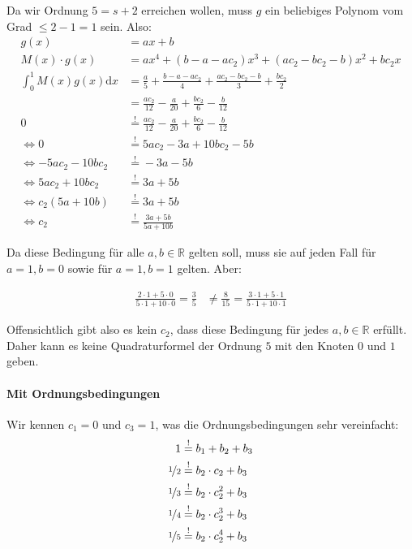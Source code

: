 Da wir Ordnung $5 = s + 2$ erreichen wollen, muss $g$ ein beliebiges
Polynom vom Grad $\leq 2-1 = 1$ sein. Also:
\begin{align}
    g(x) &= ax + b\\
    M(x) \cdot g(x) &= ax^4 + (b-a-ac_2)x^3 + (ac_2-bc_2-b)x^2 + b c_2 x\\
    \int_0^1 M(x) g(x) \mathrm{d} x &= \frac{a}{5} + \frac{b-a-ac_2}{4} + \frac{ac_2 - bc_2-b}{3} + \frac{b c_2}{2}\\
    &= \frac{a c_2}{12}-\frac{a}{20}+\frac{b c_2}{6}-\frac{b}{12}\\
    0 &\stackrel{!}{=}\frac{a c_2}{12}-\frac{a}{20}+\frac{b c_2}{6}-\frac{b}{12}\\
    \Leftrightarrow 0 &\stackrel{!}{=} 5 a c_2 - 3a + 10 b c_2 - 5 b\\
    \Leftrightarrow -5 a c_2 - 10 b c_2&\stackrel{!}{=}  - 3a - 5 b\\
    \Leftrightarrow 5 a c_2 + 10 b c_2&\stackrel{!}{=}  3a + 5 b\\
    \Leftrightarrow c_2(5 a + 10 b)&\stackrel{!}{=}  3a + 5 b\\
    \Leftrightarrow c_2 &\stackrel{!}{=}  \frac{3a + 5 b}{5 a + 10 b}
\end{align}

Da diese Bedingung für alle $a, b \in \mathbb{R}$ gelten soll, muss
sie auf jeden Fall für $a=1, b=0$ sowie für $a=1, b=1$ gelten. Aber:

\begin{align}
    \frac{2\cdot1+5\cdot0}{5\cdot1+10\cdot0} = \frac{3}{5} &\neq \frac{8}{15} = \frac{3\cdot1+5\cdot1}{5\cdot1+10\cdot1}
\end{align}

Offensichtlich gibt also es kein $c_2$, dass diese Bedingung für jedes $a,b \in \mathbb{R}$ 
erfüllt. Daher kann es keine Quadraturformel der Ordnung $5$ mit den Knoten
$0$ und $1$ geben.

\paragraph*{Mit Ordnungsbedingungen}
Wir kennen $c_1 = 0$ und $c_3=1$, was die Ordnungsbedingungen
sehr vereinfacht:
\begin{align}
    1 &\stackrel{!}{=} b_1 + b_2 + b_3\\
    \nicefrac{1}{2} &\stackrel{!}{=} b_2 \cdot c_2 + b_3 \label{eq:bed2}\\
    \nicefrac{1}{3} &\stackrel{!}{=} b_2 \cdot c_2^2 + b_3 \label{eq:bed3}\\
    \nicefrac{1}{4} &\stackrel{!}{=} b_2 \cdot c_2^3 + b_3\\
    \nicefrac{1}{5} &\stackrel{!}{=} b_2 \cdot c_2^4 + b_3
\end{align}

